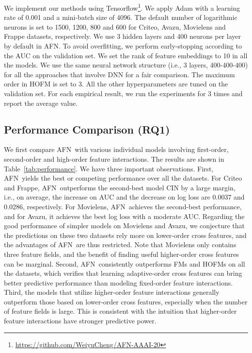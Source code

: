 \documentclass[letterpaper]{article} \usepackage{aaai20}  \usepackage{times}  \usepackage{helvet} \usepackage{courier}  \usepackage[hyphens]{url}  \usepackage{graphicx} \urlstyle{rm} \def\UrlFont{\rm}  \usepackage{graphicx}  \frenchspacing  \setlength{\pdfpagewidth}{8.5in}  \setlength{\pdfpageheight}{11in}
\newcommand{\model}{{AFN}~}
\newcommand{\modelns}{{AFN}}
\begin{document}
We implement our methods using Tensorflow\footnote{\small\url{https://github.com/WeiyuCheng/AFN-AAAI-20}}. We apply Adam with a learning rate of 0.001 and a mini-batch size of 4096. The default number of logarithmic neurons is set to 1500, 1200, 800 and 600 for Criteo, Avazu, Movielens and Frappe datasets, respectively. We use 3 hidden layers and 400 neurons per layer by default in \modelns. To avoid overfitting, we perform early-stopping according to the AUC on the validation set. 
We set the rank of feature embeddings to 10 in all the models. We use the same neural network structure (i.e., 3 layers, 400-400-400) for all the approaches that involve DNN for a fair comparison. The maximum order in HOFM is set to 3. All the other hyperparameters are tuned on the validation set. For each empirical result, we run the experiments for 3 times and report the average value. 

\subsection{Performance Comparison (RQ1)}

We first compare \model with various individual models involving first-order, second-order and high-order feature interactions.
The results are shown in Table~\ref{tab:performance}.
We have three important observations. First, \model yields the best or competing performance over all the datasets. For Criteo and Frappe, \model outperforms the second-best model CIN by a large margin, i.e., on average, the increase on AUC and the decrease on log loss are 0.0037 and 0.0286, respectively. For Movielens, \model achieves the second-best performance, and for Avazu, it achieves the best log loss with a moderate AUC. Regarding the good performance of simpler models on Movielens and Avazu, we conjecture that the predictions on these two datasets rely more on lower-order cross features, and the advantages of \model are thus restricted. Note that Movielens only contains three feature fields, and the benefit of finding useful higher-order cross features can be marginal.
Second, \model consistently outperforms FMs and HOFMs on all the datasets, which verifies that learning adaptive-order cross features can bring better predictive performance than modeling fixed-order feature interactions.
Third, the models that utilize higher-order feature interactions generally outperform those based on lower-order cross features, especially when the number of feature fields is large.
This is consistent with the intuition that higher-order feature interactions have stronger predictive power.
\end{document}
